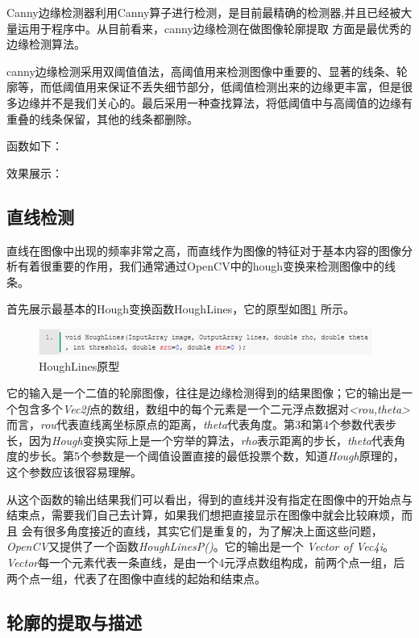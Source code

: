 \documentclass{XDBAthesis}
\begin{document}
Canny边缘检测器利用Canny算子进行检测，是目前最精确的检测器,并且已经被大量运用于程序中。从目前看来，canny边缘检测在做图像轮廓提取 方面是最优秀的边缘检测算法。

canny边缘检测采用双阈值值法，高阈值用来检测图像中重要的、显著的线条、轮廓等，而低阈值用来保证不丢失细节部分，低阈值检测出来的边缘更丰富，但是很多边缘并不是我们关心的。最后采用一种查找算法，将低阈值中与高阈值的边缘有重叠的线条保留，其他的线条都删除。

函数如下：

效果展示：



\subsection{直线检测}

直线在图像中出现的频率非常之高，而直线作为图像的特征对于基本内容的图像分析有着很重要的作用，我们通常通过OpenCV中的hough变换来检测图像中的线条。

首先展示最基本的Hough变换函数HoughLines，它的原型如图\ref{fg:yuan} 所示。
\begin{figure}[htb]
    \centering
    \includegraphics[width=\textwidth]{figure/code}
    \caption{HoughLines原型}
    \label{fg:yuan}
\end{figure}

 

    它的输入是一个二值的轮廓图像，往往是边缘检测得到的结果图像；它的输出是一个包含多个\emph{Vec2f}点的数组，数组中的每个元素是一个二元浮点数据对\emph{<rou,theta>}而言，\emph{rou}代表直线离坐标原点的距离，\emph{theta}代表角度。第3和第4个参数代表步长，因为\emph{Hough}变换实际上是一个穷举的算法，\emph{rho}表示距离的步长，\emph{theta}代表角度的步长。第5个参数是一个阈值设置直接的最低投票个数，知道\emph{Hough}原理的，这个参数应该很容易理解。

   从这个函数的输出结果我们可以看出，得到的直线并没有指定在图像中的开始点与结束点，需要我们自己去计算，如果我们想把直接显示在图像中就会比较麻烦，而且 会有很多角度接近的直线，其实它们是重复的，为了解决上面这些问题，\emph{OpenCV}又提供了一个函数\emph{HoughLinesP()}。它的输出是一个 \emph{Vector of Vec4i}。\emph{Vector}每一个元素代表一条直线，是由一个4元浮点数组构成，前两个点一组，后两个点一组，代表了在图像中直线的起始和结束点。

\subsection{轮廓的提取与描述}
\end{document}
